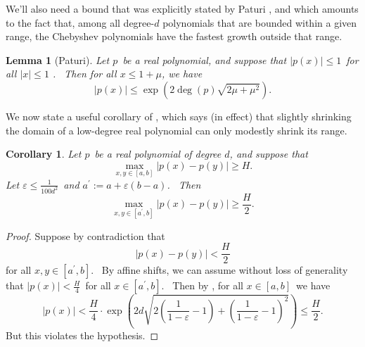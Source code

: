 \documentclass[10pt,a4paper]{article}
\newtheorem{corollary}[theorem]{Corollary}
\newtheorem{lemma}[theorem]{Lemma}
\newcommand{\<}{\langle}
\renewcommand{\>}{\rangle}
\begin{document}
We'll also need a bound that was explicitly stated by Paturi \cite{paturi},
and which amounts to the fact that, among all degree-$d$
polynomials that are bounded within a given range, the Chebyshev polynomials
have the fastest growth outside that range.

\begin{lemma}[Paturi]
\label{paturilem}Let $p$\ be a real polynomial, and suppose that $\left\vert
p\left( x\right) \right\vert \leq1$\ for all $\left\vert x\right\vert \leq1$
. \ Then for all $x\leq1+\mu$, we have
\begin{equation}
\left\vert p\left( x\right) \right\vert \leq\exp\left( 2\deg\left( p\right)
\sqrt{2\mu+\mu^{2}}\right) .
\end{equation}
\end{lemma}

We now state a useful corollary of , which says (in effect)
that slightly shrinking the domain of a low-degree real polynomial can only
modestly shrink its range.

\begin{corollary}
\label{paturicor}Let $p$\ be a real polynomial of degree $d$, and suppose
that
\begin{equation}
\max_{x,y\in\left[ a,b\right] }\left\vert p\left( x\right) -p\left( y\right)
\right\vert \geq H.
\end{equation}
Let $\varepsilon\leq\frac{1}{100d^{2}}$\ and $a^{\prime}:=a+\varepsilon
\left( b-a\right) $. \ Then
\begin{equation}
\max_{x,y\in\left[ a^{\prime},b\right] }\left\vert p\left( x\right) -p\left(
y\right) \right\vert \geq\frac{H}{2}.
\end{equation}
\end{corollary}

\begin{proof}
Suppose by contradiction that
\begin{equation}
\left\vert p\left(  x\right)  -p\left(  y\right)  \right\vert <\frac{H}{2}
\end{equation}
for all $x,y\in\left[  a^{\prime},b\right]  $. \ By affine shifts, we can
assume without loss of generality that $\left\vert p\left(  x\right)
\right\vert <\frac{H}{4}$\ for all $x\in\left[  a^{\prime},b\right]  $. \ Then
by , for all $x\in\left[  a,b\right]  $\ we have
\begin{equation}
\left\vert p\left(  x\right)  \right\vert <\frac{H}{4}\cdot\exp\left(
2d\sqrt{2\left(  \frac{1}{1-\varepsilon}-1\right)  +\left(  \frac
{1}{1-\varepsilon}-1\right)  ^{2}}\right)  \leq\frac{H}{2}.
\end{equation}
But this violates the hypothesis.
\end{proof}
\end{document}
